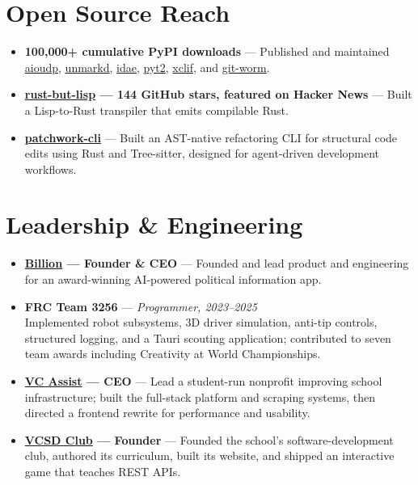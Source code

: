 \documentclass[11pt,letterpaper]{article}
\begin{document}
\section{Open Source Reach}
\begin{itemize}[leftmargin=1.35em,nosep,itemsep=2.5pt]
\item \textbf{100,000+ cumulative PyPI downloads} --- Published and maintained \href{https://pypi.org/project/aioudp/}{aioudp}, \href{https://pypi.org/project/unmarkd/}{unmarkd}, \href{https://pypi.org/project/idae/}{idae}, \href{https://github.com/ThatXliner/pyt2}{pyt2}, \href{https://pypi.org/project/xclif/}{xclif}, and \href{https://pypi.org/project/git-worm/}{git-worm}.
\item \textbf{\href{https://github.com/ThatXliner/rust-but-lisp}{rust-but-lisp} --- 144 GitHub stars, featured on Hacker News} --- Built a Lisp-to-Rust transpiler that emits compilable Rust.
\item \textbf{\href{https://github.com/ThatXliner/patchwork-cli}{patchwork-cli}} --- Built an AST-native refactoring CLI for structural code edits using Rust and Tree-sitter, designed for agent-driven development workflows.
\end{itemize}

\section{Leadership \& Engineering}
\begin{itemize}[leftmargin=1.35em,nosep,itemsep=2.5pt]
\item \textbf{\href{https://github.com/billion-app/billion}{Billion} --- Founder \& CEO} --- Founded and lead product and engineering for an award-winning AI-powered political information app.
\item \textbf{FRC Team 3256} --- \textit{Programmer, 2023--2025} \\
Implemented robot subsystems, 3D driver simulation, anti-tip controls, structured logging, and a Tauri scouting application; contributed to seven team awards including Creativity at World Championships.
\item \textbf{\href{https://vcassist.org}{VC Assist} --- CEO} --- Lead a student-run nonprofit improving school infrastructure; built the full-stack platform and scraping systems, then directed a frontend rewrite for performance and usability.
\item \textbf{\href{https://vcsdclub.org}{VCSD Club} --- Founder} --- Founded the school's software-development club, authored its curriculum, built its website, and shipped an interactive game that teaches REST APIs.
\end{itemize}
\end{document}
